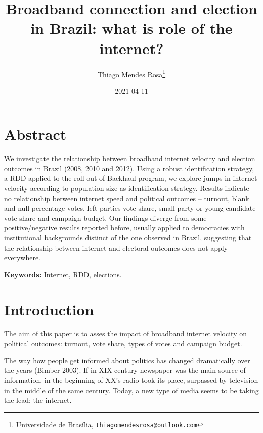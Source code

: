 \documentclass[
  12pt,
]{article}
\title{Broadband connection and election in Brazil: what is role of the
internet?}
\author{Thiago Mendes Rosa\footnote{Universidade de Brasília,
  \href{mailto:thiagomendesrosa@outlook.com}{\nolinkurl{thiagomendesrosa@outlook.com}}}}
\date{2021-04-11}
\begin{document}
\maketitle

\let\oldthebibliography\thebibliography
\let\endoldthebibliography\endthebibliography
\renewenvironment{thebibliography}[1]{
  \begin{oldthebibliography}{#1}
    \setlength{\itemsep}{0em}
    \setlength{\parskip}{0em}
}
{
  \end{oldthebibliography}
}

\allsectionsfont{\centering}

\hypertarget{abstract}{%
\section*{Abstract}\label{abstract}}

We investigate the relationship between broadband internet velocity and
election outcomes in Brazil (2008, 2010 and 2012). Using a robust
identification strategy, a RDD applied to the roll out of Backhaul
program, we explore jumps in internet velocity according to population
size as identification strategy. Results indicate no relationship
between internet speed and political outcomes -- turnout, blank and null
percentage votes, left parties vote share, small party or young
candidate vote share and campaign budget. Our findings diverge from some
positive/negative results reported before, usually applied to
democracies with institutional backgrounds distinct of the one observed
in Brazil, suggesting that the relationship between internet and
electoral outcomes does not apply everywhere.

\textbf{Keywords:} Internet, RDD, elections.

\allsectionsfont{\raggedright}

\clearpage

\hypertarget{introduction}{%
\section*{Introduction}\label{introduction}}

The aim of this paper is to asses the impact of broadband internet
velocity on political outcomes: turnout, vote share, types of votes and
campaign budget.

The way how people get informed about politics has changed dramatically
over the years (Bimber 2003). If in XIX century newspaper was the main
source of information, in the beginning of XX's radio took its place,
surpassed by television in the middle of the same century. Today, a new
type of media seems to be taking the lead: the internet.
\end{document}
